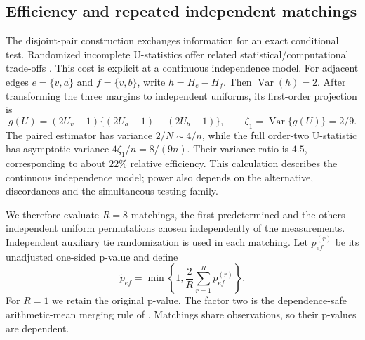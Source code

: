 \subsection{Efficiency and repeated independent matchings}
The disjoint-pair construction exchanges information for an exact conditional test. Randomized incomplete U-statistics offer related statistical/computational trade-offs \citep{chenkato2019}. This cost is explicit at a continuous independence model. For adjacent edges $e=\{v,a\}$ and $f=\{v,b\}$, write $h=H_e-H_f$. Then $\operatorname{Var}(h)=2$. After transforming the three margins to independent uniforms, its first-order projection is
\[
 g(U)=(2U_v-1)\{(2U_a-1)-(2U_b-1)\},\qquad
 \zeta_1=\operatorname{Var}\{g(U)\}=2/9.
\]
The paired estimator has variance $2/N\sim4/n$, while the full order-two U-statistic has asymptotic variance $4\zeta_1/n=8/(9n)$. Their variance ratio is $4.5$, corresponding to about $22\%$ relative efficiency. This calculation describes the continuous independence model; power also depends on the alternative, discordances and the simultaneous-testing family.

We therefore evaluate $R=8$ matchings, the first predetermined and the others independent uniform permutations chosen independently of the measurements. Independent auxiliary tie randomization is used in each matching. Let $p^{(r)}_{ef}$ be its unadjusted one-sided p-value and define
\begin{equation}\label{eq:merge}
 \widetilde p_{ef}=\min\left\{1,\frac{2}{R}\sum_{r=1}^R p^{(r)}_{ef}\right\}.
\end{equation}
For $R=1$ we retain the original p-value. The factor two is the dependence-safe arithmetic-mean merging rule of \citet{vovk2020}. Matchings share observations, so their p-values are dependent.

